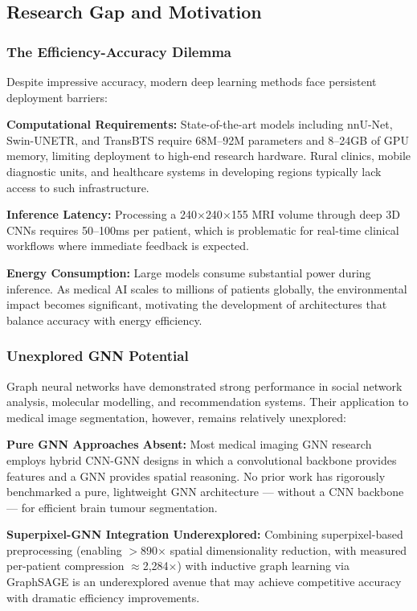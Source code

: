 \subsection{Research Gap and Motivation}

\subsubsection{The Efficiency-Accuracy Dilemma}

Despite impressive accuracy, modern deep learning methods face persistent deployment barriers:

\textbf{Computational Requirements:} State-of-the-art models including nnU-Net, Swin-UNETR, and TransBTS require 68M--92M parameters and 8--24GB of GPU memory, limiting deployment to high-end research hardware. Rural clinics, mobile diagnostic units, and healthcare systems in developing regions typically lack access to such infrastructure.

\textbf{Inference Latency:} Processing a 240$\times$240$\times$155 MRI volume through deep 3D CNNs requires 50--100ms per patient, which is problematic for real-time clinical workflows where immediate feedback is expected.

\textbf{Energy Consumption:} Large models consume substantial power during inference. As medical AI scales to millions of patients globally, the environmental impact becomes significant, motivating the development of architectures that balance accuracy with energy efficiency.

\subsubsection{Unexplored GNN Potential}

Graph neural networks have demonstrated strong performance in social network analysis, molecular modelling, and recommendation systems. Their application to medical image segmentation, however, remains relatively unexplored:

\textbf{Pure GNN Approaches Absent:} Most medical imaging GNN research employs hybrid CNN-GNN designs in which a convolutional backbone provides features and a GNN provides spatial reasoning. No prior work has rigorously benchmarked a pure, lightweight GNN architecture — without a CNN backbone — for efficient brain tumour segmentation.

\textbf{Superpixel-GNN Integration Underexplored:} Combining superpixel-based preprocessing (enabling $>$890$\times$ spatial dimensionality reduction, with measured per-patient compression $\approx$2,284$\times$) with inductive graph learning via GraphSAGE is an underexplored avenue that may achieve competitive accuracy with dramatic efficiency improvements.

